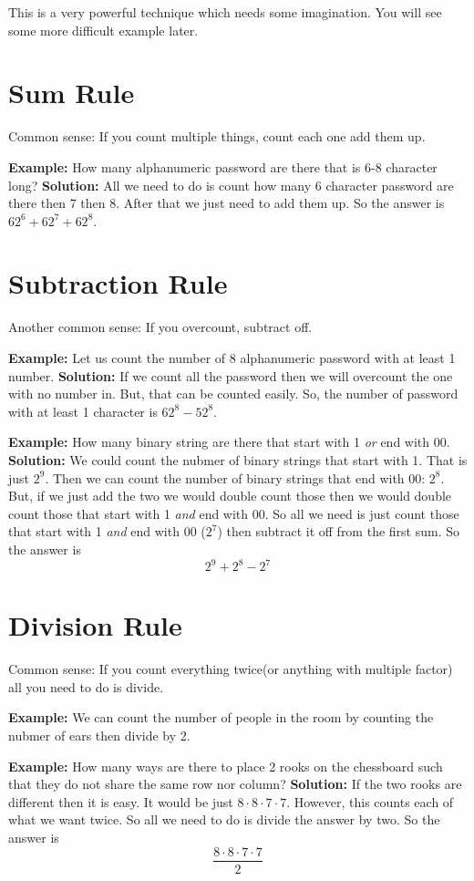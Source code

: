 \documentclass[a4paper, 12pt]{article}
\newcommand{\example}{\vspace{1em}\noindent\textbf{Example:} }
\newcommand{\solution}{\newline\noindent\textbf{Solution:} }
\begin{document}
\begin{multicols}{2}
	This is a very powerful technique which needs some imagination. You will see some more difficult example later.
	

	\section*{Sum Rule}
	Common sense: If you count multiple things, count each one add them up.
	
	\example How many alphanumeric password are there that is 6-8 character long?
	\solution All we need to do is count how many 6 character password are there then 7 then 8. After that we just need to add them up. So the answer is $62^6 + 62^7 + 62^8$.
	
	\section*{Subtraction Rule}
	Another common sense: If you overcount, subtract off.
	
	\example Let us count the number of 8 alphanumeric password with at least 1 number.
	\solution If we count all the password then we will overcount the one with no number in. But, that can be counted easily. So, the number of password with at least 1 character is $62^8 - 52^8$.
	
	\example How many binary string are there that start with 1 \emph{or} end with 00.
	\solution We could count the nubmer of binary strings that start with 1. That is just $2^9$. Then we can count the number of binary strings that end with 00: $2^8$. But, if we just add the two we would double count those then we would double count those that start with 1 \emph{and} end with 00. So all we need is just count those that start with 1 \emph{and} end with 00 ($2^7$) then subtract it off from the first sum. So the answer is
	\[
	2^9 + 2^8 - 2^7
	\]

	\section*{Division Rule}
	Common sense: If you count everything twice(or anything with multiple factor) all you need to do is divide.
	
	\example We can count the number of people in the room by counting the nubmer of ears then divide by 2.
	
	\example How many ways are there to place 2 rooks on the chessboard such that they do not share the same row nor column?
	\solution If the two rooks are different then it is easy. It would be just $8\cdot8\cdot7\cdot7$. However, this counts each of what we want twice. So all we need to do is divide the answer by two. So the answer is
	\[
	\frac{8\cdot8\cdot7\cdot7}{2}
	\]
	

\end{multicols}
\end{document}
